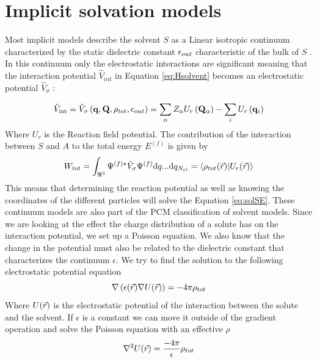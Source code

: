 \documentclass[../master_thesis.tex]{subfiles}
\begin{document}
\section{Implicit solvation models}
Most implicit models describe the solvent $S$ as a Linear isotropic continuum
characterized by the static dielectric constant $\epsilon_{out}$ characteristic
of the bulk of $S$ \cite{Tomasi:1994wt, FossoTande:2013ka}. In this continuum
only the electrostatic interactions are significant \cite{Tomasi:1994wt} meaning
that the interaction potential $\hat{V}_{int}$ in Equation \ref{eq:Hsolvent}
becomes an electrostatic potential $\hat{V}_{\sigma}$ \cite{Tomasi:1994wt}:

\begin{equation}
  \hat{V}_{\mathrm{int}}=\hat{V}_{\sigma}\left(\mathbf{q}, \mathbf{Q},
  \rho_{tot}, \epsilon_{out}\right)=\sum_{\alpha} Z_{\alpha} U_r
  \left(\mathbf{Q}_{\alpha}\right)-\sum_{i} U_r\left(\mathbf{q}_{i}\right)
\end{equation}
Where $U_r$ is the Reaction field potential.
The contribution of the interaction between $S$ and $A$ to the total energy
$E^{(f)}$ is given by
\begin{equation}
  W_{tot} = \int_{\real^3}\Psi^{(f)\star}\hat{V}_{\sigma}\Psi^{(f)}\text{d}q...\text{d}q_{N_{el}}
  = \braket{\rho_{tot}(\rvec)|U_r(\rvec)}
\end{equation}
This means that determining the reaction potential as well as knowing the coordinates
of the different particles will solve the Equation \ref{eq:solSE}.
These continuum models are also part of the \ac{PCM} classification of solvent
models.
Since we are looking at the effect the charge distribution of a solute has on
the interaction potential, we set up a Poisson equation. We also know that the change in
the potential must also be related to the dielectric constant that characterizes
the continuum $\epsilon$. We try to find the solution to the following
electrostatic potential equation
\begin{equation}
  \nabla\left( \epsilon(\vec{r}) \nabla U(\vec{r})\right) = -4\pi\rho_{tot}
\end{equation}
Where $U(\vec{r})$ is the electrostatic potential of the interaction between
the solute and the solvent. If $\epsilon$ is a constant we can move it outside
of the gradient operation and solve the Poisson equation with an effective $\rho$
\begin{equation}
  \nabla^2U(\vec{r})=\frac{-4\pi}{\epsilon}\rho_{tot}
\end{equation}
\end{document}
